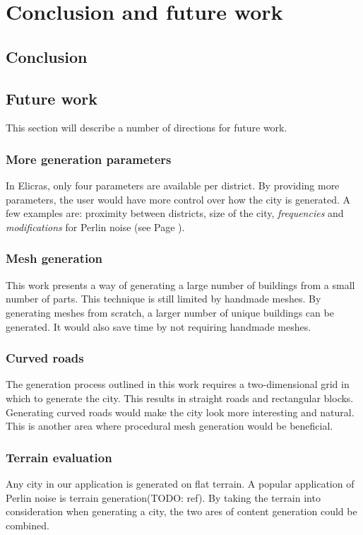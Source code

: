 \section{Conclusion and future work}
	\subsection{Conclusion}
	
	\subsection{Future work}
	This section will describe a number of directions for future work.
	
		\subsubsection{More generation parameters}
		In Elicras, only four parameters are available per district. By providing more parameters, the user would have more control over how the city is generated. A few examples are: proximity between districts, size of the city, \textit{frequencies} and \textit{modifications} for Perlin noise (see Page \pageref{fig:normal-and-modified-perlin}).
	
		\subsubsection{Mesh generation}
		This work presents a way of generating a large number of buildings from a small number of parts. This technique is still limited by handmade meshes. By generating meshes from scratch, a larger number of unique buildings can be generated. It would also save time by not requiring handmade meshes.
		
		\subsubsection{Curved roads}
		The generation process outlined in this work requires a two-dimensional grid in which to generate the city. This results in straight roads and rectangular blocks. Generating curved roads would make the city look more interesting and natural. This is another area where procedural mesh generation would be beneficial.
		
		\subsubsection{Terrain evaluation}
		Any city in our application is generated on flat terrain. A popular application of Perlin noise is terrain generation(TODO: ref). By taking the terrain into consideration when generating a city, the two ares of content generation could be combined.
